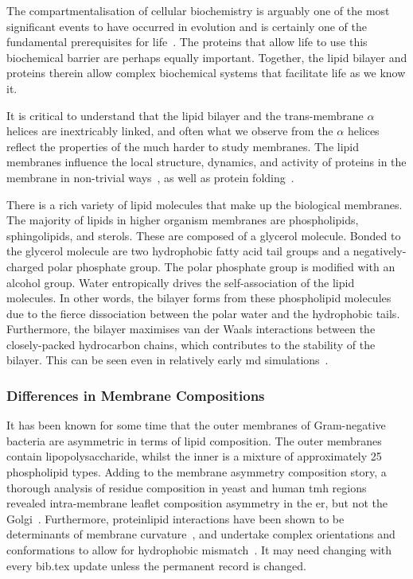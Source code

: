 The compartmentalisation of cellular biochemistry is arguably one of the most significant events to have occurred in evolution and is certainly one of the fundamental prerequisites for life~\cite{Koshland2002}.
 The proteins that allow life to use this biochemical barrier are perhaps equally important.
Together, the lipid bilayer and proteins therein allow complex biochemical systems that facilitate life as we know it.

It is critical to understand that the lipid bilayer and the trans-membrane $\alpha$ helices are inextricably linked, and often what we observe from the $\alpha$ helices reflect the properties of the much harder to study membranes.
The lipid membranes influence the local structure, dynamics, and activity of proteins in the membrane in non-trivial ways~\cite{Bondar2010, Bondar2009, Jardon-Valadez2010, Kalvodova2005, Urban2005, White2001a, Jensen2004, Henin2014}, as well as protein folding~\cite{Kauko2010}.

There is a rich variety of lipid molecules that make up the biological membranes.
The majority of lipids in higher organism membranes are phospholipids, sphingolipids, and sterols.
These are composed of a glycerol molecule.
Bonded to the glycerol molecule are two hydrophobic fatty acid tail groups and a negatively-charged polar phosphate group.
The polar phosphate group is modified with an alcohol group.
Water entropically drives the self-association of the lipid molecules.
In other words, the bilayer forms from these phospholipid molecules due to the fierce dissociation between the polar water and the hydrophobic tails.
Furthermore, the bilayer maximises van der Waals interactions between the closely-packed hydrocarbon chains, which contributes to the stability of the bilayer.
This can be seen even in relatively early \gls{md} simulations~\cite{Goetz1998}.

\subsubsection{Differences in Membrane Compositions}

It has been known for some time that the outer membranes of Gram-negative bacteria are asymmetric in terms of lipid composition.
The outer membranes contain lipopolysaccharide, whilst the inner is a mixture of approximately 25 phospholipid types.
Adding to the membrane asymmetry composition story, a thorough analysis of residue composition in yeast and human \gls{tmh} regions revealed intra-membrane leaflet composition asymmetry in the \gls{er}, but not the Golgi~\cite{Sharpe2010}.
Furthermore, protein\-lipid interactions have been shown to be determinants of membrane curvature~\cite{Jensen2004}, and undertake complex orientations and conformations to allow for hydrophobic mismatch~\cite{Planque2003}.
It may need changing with every bib.tex update unless the permanent record is changed.

